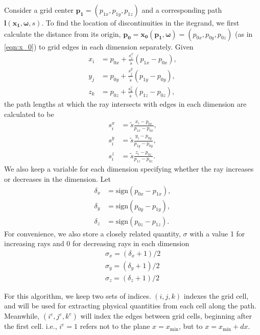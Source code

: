 \documentclass[ms,cpyr,lof,lot]{uathesis}
\newcommand\xmin{{x_{\min}}}
\newcommand{\sign}{\mbox{sign}}
\renewcommand\vec\bm
\begin{document}
Consider a grid center $\vec{p_1} = (p_{1x},p_{1y},p_{1z})$ and a corresponding path $\vec{l}(\vec{x_1}, \vec{\omega}, s)$.
To find the location of discontinuities in the itegrand, we first calculate the
distance from its origin, $\vec{p_0} = \vec{x_0}(\vec{p_1}, \vec{\omega}) = (p_{0x}, p_{0y}, p_{0z})$ (as in \eqref{eqn:x_0}) to grid edges in each dimension
separately.
Given
\begin{align}
  x_i &= p_{0x} + \frac{s_i^x}{\tilde{s}}(p_{1x}-p_{0x}), \\
  y_j &= p_{0y} + \frac{s_j^y}{\tilde{s}}(p_{1y}-p_{0y}), \\
  z_k &= p_{0z} + \frac{s_k^z}{\tilde{s}}(p_{1z}-p_{0z}),
\end{align}
the path lengths at which the ray intersects with edges in each dimension are calculated to be
\begin{align}
  s_i^x &= \tilde{s}\frac{x_i-p_{0x}}{p_{1x}-p_{0x}}, \\
  s_i^y &= \tilde{s}\frac{y_i-p_{0y}}{p_{1y}-p_{0y}}, \\
  s_i^z &= \tilde{s}\frac{z_i-p_{0z}}{p_{1z}-p_{0z}}.
\end{align}
We also keep a variable for each dimension specifying whether the ray increases
or decreases in the dimension. Let
\begin{align}
  \delta_x &= \sign(p_{0x}-p_{1x}), \\
  \delta_y &= \sign(p_{0y}-p_{1y}), \\
  \delta_z &= \sign(p_{0z}-p_{1z}).
\end{align}
For convenience, we also store a closely related quantity, $\sigma$ with a value 1 for
increasing rays and 0 for decreasing rays in each dimension
\begin{align}
  \sigma_x = (\delta_x+1)/2 \\
  \sigma_y = (\delta_y+1)/2 \\
  \sigma_z = (\delta_z+1)/2
\end{align}

For this algorithm, we keep two sets of indices. $(i,j,k)$ indexes the grid
cell, and will be used for extracting physical quantities from each cell along
the path.
Meanwhile, $(i^e,j^e,k^e)$ will index the edges between grid cells, beginning
after the first cell. i.e., $i^e=1$ refers not to the plane $x=\xmin$, but to $x=\xmin+dx$.
\end{document}
